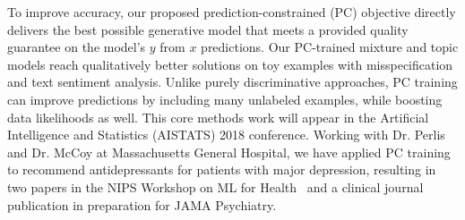 \documentclass[11pt,letterpaper]{article}
\begin{document}
To improve accuracy, our proposed prediction-constrained (PC) objective directly delivers the best possible generative model that meets a provided quality guarantee on the model's $y$ from $x$ predictions.
Our PC-trained mixture and topic models reach qualitatively better solutions on toy examples with misspecification and text sentiment analysis. Unlike purely discriminative approaches, PC training can improve predictions by including many unlabeled examples, while boosting data likelihoods as well.
This core methods work will appear in the Artificial Intelligence and Statistics (AISTATS) 2018 conference.
Working with Dr. Perlis and Dr. McCoy at Massachusetts General Hospital, we have applied PC training to recommend antidepressants for patients with major depression, resulting in two papers in the NIPS Workshop on ML for Health~\citep{hughes2017clinicalPCsLDA, hughes2016clinicalSLDA} and a clinical journal publication in preparation for JAMA Psychiatry.
\end{document}
